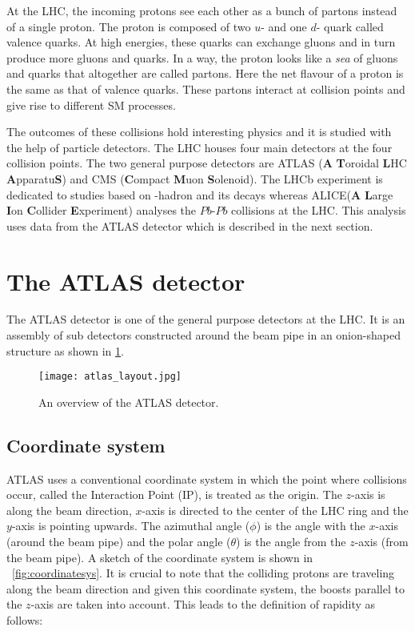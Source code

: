 At the LHC, the incoming protons see each other as a bunch of partons instead of a single 
proton. The proton is composed of two $u$- and one $d$- quark called valence quarks. At high 
energies, these quarks can exchange gluons and in turn produce more gluons and quarks. In a way,
the proton looks like a \textit{sea} of gluons and quarks that altogether are called partons. 
Here the net flavour of a proton is the same as that of valence quarks. These partons interact 
at collision points and give rise to different SM processes.

The outcomes of these collisions hold interesting physics and it is studied with the help of particle detectors. The LHC houses four main detectors at the four collision
points. The two general purpose detectors are ATLAS (\textbf{A} \textbf{T}oroidal \textbf{L}HC \textbf{A}pparatu\textbf{S})\cite{TheATLASCollaboration_2008} and
CMS (\textbf{C}ompact \textbf{M}uon \textbf{S}olenoid)\cite{TheCMSCollaboration_2008}. The LHCb experiment\cite{TheLHCbCollaboration_2008} is dedicated to 
studies based on \PB-hadron and its decays whereas ALICE(\textbf{A} \textbf{L}arge \textbf{I}on \textbf{C}ollider \textbf{E}xperiment)\cite{TheALICECollaboration_2008}
analyses the $Pb$-$Pb$ collisions at the LHC. This analysis uses data from the ATLAS detector
which is described in the next section. 


\section{The ATLAS detector}
The ATLAS detector is one of the general purpose detectors at the LHC. It is an assembly of sub detectors constructed around the beam pipe in an onion-shaped structure as shown
in \cref{fig:atlas}.

\begin{figure}[htbp]
    \centering
    \texttt{[image: atlas\_layout.jpg]}
    \caption[Overview of the ATLAS detector]{An overview of the ATLAS detector\cite{Pequenao:1095924}.}%
    \label{fig:atlas}
\end{figure}

\subsection{Coordinate system}
ATLAS uses a conventional coordinate system in which the point where collisions occur, called the Interaction Point (IP), is treated as the origin. The 
$z$-axis is along the beam direction, $x$-axis is directed to the center of the LHC ring and the $y$-axis is pointing upwards. The azimuthal angle ($\phi$) 
is the angle with the $x$-axis (around the beam pipe) and the polar angle ($\theta$) is the angle from the $z$-axis (from the beam pipe). A sketch of the coordinate
system is shown in ~\cref{fig:coordinatesys}. It is crucial to note that the colliding protons are traveling along the beam direction and given this coordinate 
system, the boosts parallel to the $z$-axis are 
taken into account. This leads to the definition of rapidity as follows:

